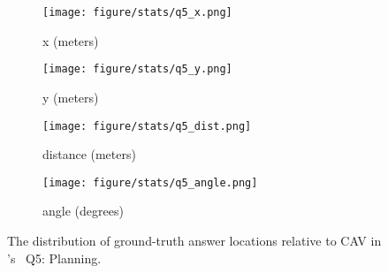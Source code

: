 \begin{figure}[!t]
        \centering
        \begin{subfigure}[t]{0.23\textwidth}
            \centering 
            \texttt{[image: figure/stats/q5\_x.png]}
            \vspace{-20pt}
            \caption[]%
            {{x (meters)}}    
        \end{subfigure}
        \hfill
        \begin{subfigure}[t]{0.23\textwidth}  
            \centering 
            \texttt{[image: figure/stats/q5\_y.png]}
            \vspace{-20pt}
            \caption[]%
            {{y (meters)}}
        \end{subfigure}

        \begin{subfigure}[t]{0.23\textwidth}
            \centering 
            \texttt{[image: figure/stats/q5\_dist.png]}
            \vspace{-20pt}
            \caption[]%
            {{distance (meters)}}
        \end{subfigure}
        \hfill
        \begin{subfigure}[t]{0.23\textwidth}
            \centering 
            \texttt{[image: figure/stats/q5\_angle.png]}
            \vspace{-20pt}
            \caption[]%
            {{angle (degrees)}}
        \end{subfigure}
        \hfill
        
        \vspace{-10pt}
        \caption[]
        {
        The distribution of ground-truth answer locations relative to CAV in \namedataset's \namevsplit~Q5: Planning. 
        } 
        \label{fig:stats_v2v_q5}
        \vspace{-10pt}
\end{figure}


